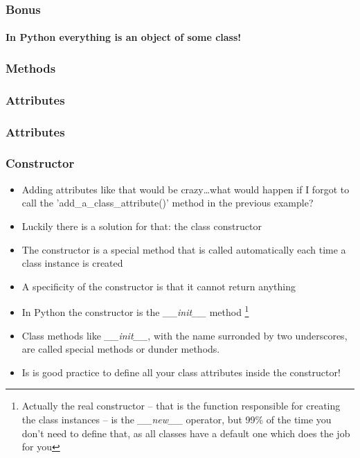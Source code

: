 \documentclass[9pt]{beamer}
\begin{document}
\begin{frame}
  \frametitle{Bonus}
  \framesubtitle{In Python everything is an object of some class!}
  
\end{frame}


\begin{frame}
  \frametitle{Methods}
  
\end{frame}


\begin{frame}
  \frametitle{Attributes}
  
\end{frame}


\begin{frame}
  \frametitle{Attributes}
  
\end{frame}


\begin{frame}
  \frametitle{Constructor}
  
  \begin{itemize}
    \small
    \item Adding attributes like that would be crazy\dots what would happen if I forgot
          to call the 'add\_a\_class\_attribute()' method in the previous example?
    \medskip
    \item Luckily there is a solution for that: the class \alert{constructor}
    \medskip
    \item The constructor is a special method that is called automatically each time
          a class instance is created
    \medskip
    \item A specificity of the constructor is that it cannot return anything
    \medskip
    \item In Python the constructor is the \emph{\_\_init\_\_} method%
          \footnote{Actually the real constructor -- that is the function responsible for 
                    creating the class instances -- is the \emph{\_\_new\_\_} operator, but 99\% of the time you don't need
                    to define that, as all classes have a default one which does the job for you}           
    \medskip
    \item Class methods like \emph{\_\_init\_\_}, with the name surronded by two underscores,
          are called \alert{special} methods or \alert{dunder} methods.
    \medskip
    \item Is is good practice to define all your class attributes inside the constructor!

  \end{itemize}

\end{frame}
\end{document}
